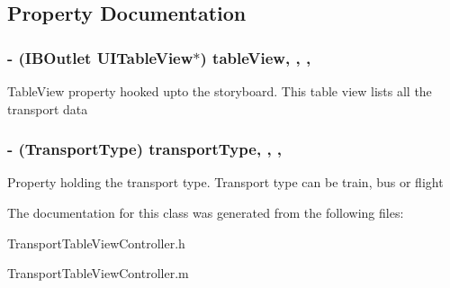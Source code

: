 \subsection{Property Documentation}
\subsubsection[{\texorpdfstring{table\+View}{tableView}}]{\setlength{\rightskip}{0pt plus 5cm}-\/ (I\+B\+Outlet U\+I\+Table\+View$\ast$) table\+View\hspace{0.3cm}{\ttfamily [read]}, {\ttfamily [write]}, {\ttfamily [nonatomic]}, {\ttfamily [retain]}}\hypertarget{interface_transport_table_view_controller_a1785d3e6d819f19e324774d783e4019f}{}\label{interface_transport_table_view_controller_a1785d3e6d819f19e324774d783e4019f}
Table\+View property hooked upto the storyboard. This table view lists all the transport data 
\subsubsection[{\texorpdfstring{transport\+Type}{transportType}}]{\setlength{\rightskip}{0pt plus 5cm}-\/ (Transport\+Type) transport\+Type\hspace{0.3cm}{\ttfamily [read]}, {\ttfamily [write]}, {\ttfamily [nonatomic]}, {\ttfamily [assign]}}\hypertarget{interface_transport_table_view_controller_a30bd421cf096f28dff64432e92b0008e}{}\label{interface_transport_table_view_controller_a30bd421cf096f28dff64432e92b0008e}
Property holding the transport type. Transport type can be train, bus or flight 

The documentation for this class was generated from the following files\+:\begin{DoxyCompactItemize}
\item 
Transport\+Table\+View\+Controller.\+h\item 
Transport\+Table\+View\+Controller.\+m\end{DoxyCompactItemize}
